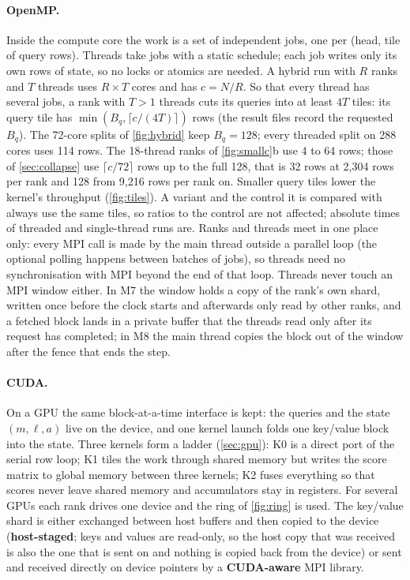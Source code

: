 \documentclass[10pt,a4paper]{article}
\newcommand{\term}[1]{\textbf{#1}}
\begin{document}
\paragraph{OpenMP.} Inside the compute core the work is a set of independent jobs,
one per (head, tile of query rows). Threads take jobs with a static schedule; each
job writes only its own rows of state, so no locks or atomics are needed. A hybrid
run with $R$ ranks and $T$ threads uses $R\times T$ cores and has $c=N/R$. So that
every thread has several jobs, a rank with $T>1$ threads cuts its queries into at
least $4T$ tiles: its query tile has $\min(B_q,\lceil c/(4T)\rceil)$ rows (the
result files record the requested $B_q$). The 72-core splits of \cref{fig:hybrid}
keep $B_q=128$; every threaded split on 288 cores uses 114 rows. The 18-thread
ranks of \cref{fig:smallc}b use 4 to 64 rows; those of \cref{sec:collapse} use
$\lceil c/72\rceil$ rows up to the full 128, that is 32 rows at 2{,}304 rows per
rank and 128 from 9{,}216 rows per rank on. Smaller query
tiles lower the kernel's throughput (\cref{fig:tiles}). A variant and the control
it is compared with always use the same tiles, so ratios to the control are not
affected; absolute times of threaded and single-thread runs are. Ranks
and threads meet in one place only: every MPI call is made by the main thread
outside a parallel loop (the optional polling happens between batches of jobs),
so threads need no synchronisation with MPI beyond the end of that loop. Threads
never touch an MPI window either. In M7 the window holds a copy of the rank's own
shard, written once before the clock starts and afterwards only read by other
ranks, and a fetched block lands in a private buffer that the threads read only
after its request has completed; in M8 the main thread copies the block out of
the window after the fence that ends the step.

\paragraph{CUDA.} On a GPU the same block-at-a-time interface is kept: the queries
and the state $(m,\ell,a)$ live on the device, and one kernel launch folds one
key/value block into the state. Three kernels form a ladder (\cref{sec:gpu}): K0 is
a direct port of the serial row loop; K1 tiles the work through shared memory but
writes the score matrix to global memory between three kernels; K2 fuses everything
so that scores never leave shared memory and accumulators stay in registers. For
several GPUs each rank drives one device and the ring of \cref{fig:ring} is used.
The key/value shard is either exchanged between host buffers and then copied to
the device (\term{host-staged}; keys and values are read-only, so the host copy that
was received is also the one that is sent on and nothing is copied back from the
device) or sent and received directly on device pointers by a \term{CUDA-aware} MPI
library.
\end{document}

